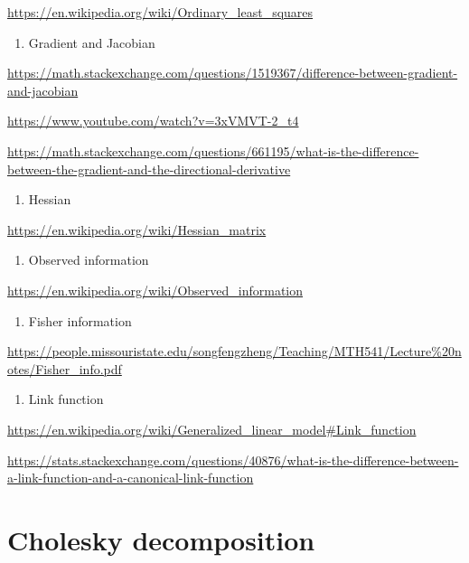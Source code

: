 \documentclass[]{book}
\providecommand{\tightlist}{%
  \setlength{\itemsep}{0pt}\setlength{\parskip}{0pt}}
\begin{document}
\url{https://en.wikipedia.org/wiki/Ordinary_least_squares}

\begin{enumerate}
\def\labelenumi{\arabic{enumi}.}
\setcounter{enumi}{3}
\tightlist
\item
  Gradient and Jacobian
\end{enumerate}

\url{https://math.stackexchange.com/questions/1519367/difference-between-gradient-and-jacobian}

\url{https://www.youtube.com/watch?v=3xVMVT-2_t4}

\url{https://math.stackexchange.com/questions/661195/what-is-the-difference-between-the-gradient-and-the-directional-derivative}

\begin{enumerate}
\def\labelenumi{\arabic{enumi}.}
\setcounter{enumi}{4}
\tightlist
\item
  Hessian
\end{enumerate}

\url{https://en.wikipedia.org/wiki/Hessian_matrix}

\begin{enumerate}
\def\labelenumi{\arabic{enumi}.}
\setcounter{enumi}{5}
\tightlist
\item
  Observed information
\end{enumerate}

\url{https://en.wikipedia.org/wiki/Observed_information}

\begin{enumerate}
\def\labelenumi{\arabic{enumi}.}
\setcounter{enumi}{6}
\tightlist
\item
  Fisher information
\end{enumerate}

\url{https://people.missouristate.edu/songfengzheng/Teaching/MTH541/Lecture\%20notes/Fisher_info.pdf}

\begin{enumerate}
\def\labelenumi{\arabic{enumi}.}
\setcounter{enumi}{7}
\tightlist
\item
  Link function
\end{enumerate}

\url{https://en.wikipedia.org/wiki/Generalized_linear_model\#Link_function}

\url{https://stats.stackexchange.com/questions/40876/what-is-the-difference-between-a-link-function-and-a-canonical-link-function}

\hypertarget{cholesky-decomposition}{%
\chapter{Cholesky decomposition}\label{cholesky-decomposition}}
\end{document}
